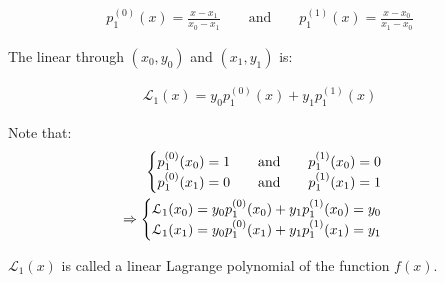         \begin{align*}
          p_1^{(0)}(x) = \frac{x - x_1}{x_0 - x_1}
          \qquad \mbox{and} \qquad
          p_1^{(1)}(x) = \frac{x - x_0}{x_1 - x_0}
        \end{align*}

      \par The linear  through
        $(x_0, y_0)$ and $(x_1, y_1)$ is:

        \begin{align*}
          \mathcal{L}_1(x) = y_0 p_1^{(0)}(x) + y_1 p_1^{(1)}(x)
        \end{align*}

      \par Note that:
        \begin{align*}
          \begin{cases}
            p_1^{(0)}(x_0) = 1 \qquad \mbox{and} \qquad p_1^{(1)}(x_0) = 0 \\
            p_1^{(0)}(x_1) = 0 \qquad \mbox{and} \qquad p_1^{(1)}(x_1) = 1
          \end{cases} \\
          \Rightarrow
          \begin{cases}
            \mathcal{L}_1(x_0) = y_0 p_1^{(0)}(x_0) + y_1 p_1^{(1)}(x_0) = y_0 \\
            \mathcal{L}_1(x_1) = y_0 p_1^{(0)}(x_1) + y_1 p_1^{(1)}(x_1) = y_1
          \end{cases}
        \end{align*}

        \par $\mathcal{L}_1(x)$ is called a linear Lagrange polynomial of the
          function $f(x)$.

